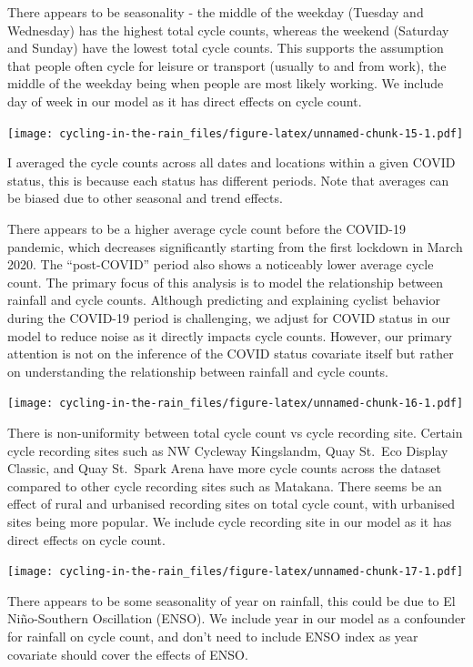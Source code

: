 \documentclass[
]{article}
\begin{document}
There appears to be seasonality - the middle of the weekday (Tuesday and
Wednesday) has the highest total cycle counts, whereas the weekend
(Saturday and Sunday) have the lowest total cycle counts. This supports
the assumption that people often cycle for leisure or transport (usually
to and from work), the middle of the weekday being when people are most
likely working. We include day of week in our model as it has direct
effects on cycle count.

\texttt{[image: cycling-in-the-rain\_files/figure-latex/unnamed-chunk-15-1.pdf]}

I averaged the cycle counts across all dates and locations within a
given COVID status, this is because each status has different periods.
Note that averages can be biased due to other seasonal and trend
effects.

There appears to be a higher average cycle count before the COVID-19
pandemic, which decreases significantly starting from the first lockdown
in March 2020. The ``post-COVID'' period also shows a noticeably lower
average cycle count. The primary focus of this analysis is to model the
relationship between rainfall and cycle counts. Although predicting and
explaining cyclist behavior during the COVID-19 period is challenging,
we adjust for COVID status in our model to reduce noise as it directly
impacts cycle counts. However, our primary attention is not on the
inference of the COVID status covariate itself but rather on
understanding the relationship between rainfall and cycle counts.

\texttt{[image: cycling-in-the-rain\_files/figure-latex/unnamed-chunk-16-1.pdf]}

There is non-uniformity between total cycle count vs cycle recording
site. Certain cycle recording sites such as NW Cycleway Kingslandm, Quay
St.~Eco Display Classic, and Quay St.~Spark Arena have more cycle counts
across the dataset compared to other cycle recording sites such as
Matakana. There seems be an effect of rural and urbanised recording
sites on total cycle count, with urbanised sites being more popular. We
include cycle recording site in our model as it has direct effects on
cycle count.

\texttt{[image: cycling-in-the-rain\_files/figure-latex/unnamed-chunk-17-1.pdf]}

There appears to be some seasonality of year on rainfall, this could be
due to El Niño-Southern Oscillation (ENSO). We include year in our model
as a confounder for rainfall on cycle count, and don't need to include
ENSO index as year covariate should cover the effects of ENSO.
\end{document}
